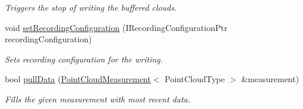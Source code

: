 \begin{DoxyCompactItemize}
\begin{DoxyCompactList}\small\item\em Triggers the stop of writing the buffered clouds. \end{DoxyCompactList}\item 
void \hyperlink{class_kinect_cloud_file_writer_ae99ef4fbf2221d0dfe5be340f1f8aac7}{set\+Recording\+Configuration} (I\+Recording\+Configuration\+Ptr recording\+Configuration)
\begin{DoxyCompactList}\small\item\em Sets recording configuration for the writing. \end{DoxyCompactList}\item 
bool \hyperlink{class_kinect_cloud_file_writer_a8d024ff1c2123d1a5600d20b6043dd8a}{pull\+Data} (\hyperlink{class_point_cloud_measurement}{Point\+Cloud\+Measurement}$<$ Point\+Cloud\+Type $>$ \&measurement)
\begin{DoxyCompactList}\small\item\em Fills the given measurement with most recent data. \end{DoxyCompactList}\end{DoxyCompactItemize}
